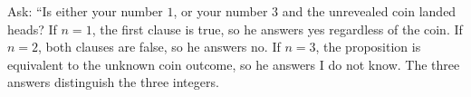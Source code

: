 Ask: ``Is either your number $1$, or your number $3$ and the unrevealed coin landed heads? If $n=1$, the first clause is true, so he answers yes regardless of the coin. If $n=2$, both clauses are false, so he answers no. If $n=3$, the proposition is equivalent to the unknown coin outcome, so he answers I do not know. The three answers distinguish the three integers.
